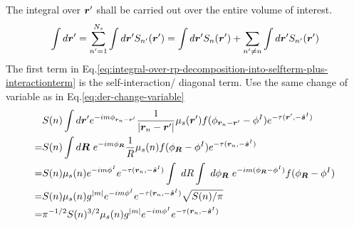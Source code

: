 \documentclass [10pt,letterpaper]{article}
\renewcommand{\vec}{\vectorsym}
\newcommand{\unitvec}[1]{\hat{\vec{#1}}}
\begin{document}
The integral over $\vec{r}^\prime$ shall be carried out over the entire volume of interest.
\begin{equation} \label{eq:integral-over-rp-decomposition-into-selfterm-plus-interactionterm}
	\begin{split}
		\int d\vec{r}^\prime
		=
		\sum \limits_{n^\prime=1}^{N_s}
		\int d\vec{r}^\prime
		S_{n^\prime}(\vec{r}^\prime)
		=
		\int d\vec{r}^\prime
		S_n(\vec{r}^\prime)
		+
		\sum \limits_{n^\prime \neq n}
		\int d\vec{r}^\prime
		S_{n^\prime}(\vec{r}^\prime)
	\end{split}
\end{equation}
The first term in Eq.\eqref{eq:integral-over-rp-decomposition-into-selfterm-plus-interactionterm} is the self-interaction/ diagonal term. Use the same change of variable as in Eq.\eqref{eq:der-change-variable}
\begin{equation} \label{eq:result-diagonal-Vscnm-1pt}
	\begin{split} 
		&
		S(n)
		\int d\vec{r}^\prime
		e^{-i m \phi_{\vec{r}_n-\vec{r}^\prime}}
		\frac
		{1}
		{\lvert \vec{r}_n-\vec{r}^\prime \rvert}
		\mu_s(\vec{r}^\prime)
		f(\phi_{\vec{r}_n-\vec{r}^\prime}-\phi^I)
		e^{-\tau(\vec{r}^\prime,-\unitvec{s}^I)} 
		\\
		=& 
		S(n)
		\int d\vec{R}
		\ e^{-i m \phi_{\vec{R}} }
		\frac
		{1}
		R
		\mu_s(n)
		f(\phi_{\vec{R}}-\phi^I)
		e^{-\tau(\vec{r}_n,-\unitvec{s}^I)} 
		\\
		=& 
		S(n)
		\mu_s(n)
		e^{-i m \phi^I }
		e^{-\tau(\vec{r}_n,-\unitvec{s}^I)} 
		\int \ dR
		\int \ d\phi_{\vec{R}}
		\ e^{-i m (\phi_{\vec{R}} - \phi^I)}
		f(\phi_{\vec{R}}-\phi^I)
		\\
		=& 
		S(n)
		\mu_s(n)
		g^{\lvert m \rvert}
		e^{-i m \phi^I }
		e^{-\tau(\vec{r}_n,-\unitvec{s}^I)} 
		\sqrt{S(n)/\pi}
		\\
		=& 
		\pi^{-1/2}
		S(n)^{3/2}
		\mu_s(n)
		g^{\lvert m \rvert}
		e^{-i m \phi^I }
		e^{-\tau(\vec{r}_n,-\unitvec{s}^I)} 
	\end{split}
\end{equation}
\end{document}
